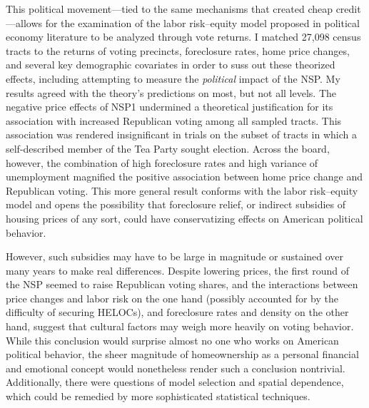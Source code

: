 \documentclass[12pt,oneside]{psthesis}
\begin{document}
This political movement---tied to the same mechanisms that created cheap credit---allows for the examination of the labor risk--equity model proposed in political economy literature to be analyzed through vote returns.
I matched 27,098 census tracts to the returns of voting precincts, foreclosure rates, home price changes, and several key demographic covariates in order to suss out these theorized effects, including attempting to measure the \emph{political} impact of the NSP.
My results agreed with the theory's predictions on most, but not all levels.
The negative price effects of NSP1 undermined a theoretical justification for its association with increased Republican voting among all sampled tracts.
This association was rendered insignificant in trials on the subset of tracts in which a self-described member of the Tea Party sought election.
Across the board, however, the combination of high foreclosure rates and high variance of unemployment magnified the positive association between home price change and Republican voting.
This more general result conforms with the labor risk--equity model and opens the possibility that foreclosure relief, or indirect subsidies of housing prices of any sort, could have conservatizing effects on American political behavior.

However, such subsidies may have to be large in magnitude or sustained over many years to make real differences.
Despite lowering prices, the first round of the NSP seemed to raise Republican voting shares, and the interactions between price changes and labor risk on the one hand (possibly accounted for by the difficulty of securing HELOCs), and foreclosure rates and density on the other hand, suggest that cultural factors may weigh more heavily on voting behavior.
While this conclusion would surprise almost no one who works on American political behavior, the sheer magnitude of homeownership as a personal financial and emotional concept would nonetheless render such a conclusion nontrivial.
Additionally, there were questions of model selection and spatial dependence, which could be remedied by more sophisticated statistical techniques.
\end{document}
